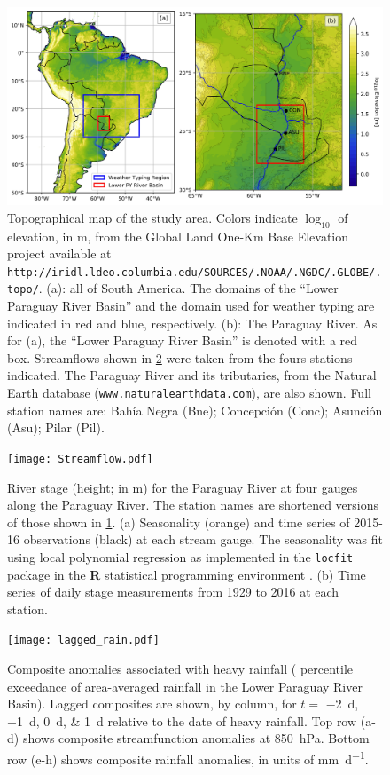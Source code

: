 \documentclass{ametsoc}
\begin{document}
\begin{figure}
	\noindent\includegraphics[width=6.5in]{study_area.jpg}
	\caption{
		Topographical map of the study area.
		Colors indicate $\log_{10}$ of elevation, in \si{\meter}, from the Global Land One-Km Base Elevation project available at \texttt{http://iridl.ldeo.columbia.edu/SOURCES/.NOAA/.NGDC/.GLOBE/.topo/}.
		(a): all of South America.
		The domains of the ``Lower Paraguay River Basin'' and the domain used for weather typing are indicated in red and blue, respectively.
		(b): The Paraguay River.
		As for (a), the ``Lower Paraguay River Basin'' is denoted with a red box.
		Streamflows shown in \cref{fig:streamflow} were taken from the fours stations indicated.
		The Paraguay River and its tributaries, from the Natural Earth database (\texttt{www.naturalearthdata.com}), are also shown.
		Full station names are: Bah\'ia Negra (Bne); Concepci\'on (Conc); Asunci\'on (Asu); Pilar (Pil).
	}\label{fig:study-area}
\end{figure}

\begin{figure}
	\noindent\texttt{[image: Streamflow.pdf]}
	\caption{
		River stage (height; in \si{\meter}) for the Paraguay River at four gauges along the Paraguay River.
		The station names are shortened versions of those shown in \cref{fig:study-area}.
		(a) Seasonality (orange) and time series of 2015-16 observations (black) at each stream gauge.
			The seasonality was fit using local polynomial regression as implemented in the \texttt{locfit} package in
			the \textbf{R} statistical programming environment \citep{Loader1999}.
		(b) Time series of daily stage measurements from 1929 to 2016 at each station.
	}\label{fig:streamflow}
\end{figure}

\begin{figure}	\noindent\texttt{[image: lagged\_rain.pdf]}
	\caption{
		Composite anomalies associated with heavy rainfall ( percentile exceedance of area-averaged rainfall in the Lower Paraguay River Basin).
		Lagged composites are shown, by column, for $t = $ \SIlist{-2;-1;0;1}{\day} relative to the date of heavy rainfall.
		Top row (a-d) shows composite streamfunction anomalies at \SIlist{850}{\hecto\pascal}.
		Bottom row (e-h) shows composite rainfall anomalies, in units of \si{\milli\meter\per\day}.
	}\label{fig:lagged-rain}
\end{figure}
\end{document}

